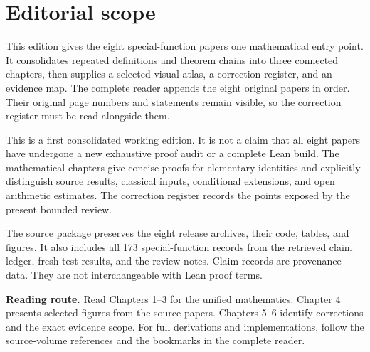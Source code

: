 \documentclass[11pt,openany]{report}
\theoremstyle{definition}
\theoremstyle{remark}
\begin{document}
\KomorebiCover

\hypersetup{pageanchor=false}

\hypersetup{pageanchor=true}
\chapter*{Editorial scope}
This edition gives the eight special-function papers one mathematical entry point. It consolidates repeated definitions and theorem chains into three connected chapters, then supplies a selected visual atlas, a correction register, and an evidence map. The complete reader appends the eight original papers in order. Their original page numbers and statements remain visible, so the correction register must be read alongside them.

This is a first consolidated working edition. It is not a claim that all eight papers have undergone a new exhaustive proof audit or a complete Lean build. The mathematical chapters give concise proofs for elementary identities and explicitly distinguish source results, classical inputs, conditional extensions, and open arithmetic estimates. The correction register records the points exposed by the present bounded review.

The source package preserves the eight release archives, their code, tables, and figures. It also includes all 173 special-function records from the retrieved claim ledger, fresh test results, and the review notes. Claim records are provenance data. They are not interchangeable with Lean proof terms.

\textbf{Reading route.} Read Chapters 1--3 for the unified mathematics. Chapter 4 presents selected figures from the source papers. Chapters 5--6 identify corrections and the exact evidence scope. For full derivations and implementations, follow the source-volume references and the bookmarks in the complete reader.
\tableofcontents
\clearpage
{}






\end{document}
